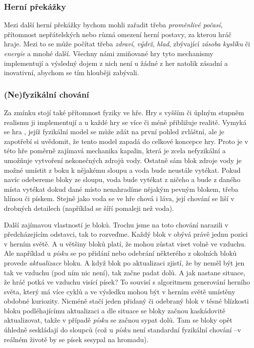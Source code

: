 \subsubsection{Herní překážky}

Mezi další herní překážky bychom mohli zařadit třeba \textit{proměnlivé počasí}, přítomnost nepřátelských \NPC{} nebo různá omezení herní postavy, za kterou hráč hraje. Mezi to se může počítat třeba \textit{zdraví}, \textit{výdrž}, \textit{hlad}, zbývající \textit{zásoba kyslíku} či \textit{energie} a mnohé další. Všechny námi zmiňované hry tyto mechanismy implementují a výsledný dojem z nich není u žádné z her natolik zásadní a inovativní, abychom se tím hlouběji zabývali.

\subsubsection{(Ne)fyzikální chování}

Za zmínku stojí také přítomnost fyziky ve hře. Hry s vyšším či úplným stupněm realismu ji implementují a u každé hry se více či méně přibližuje realitě. Vymyká se hra \MC{}, jejíž fyzikální model se může zdát na první pohled zvláštní, ale je zapotřebí si uvědomit, že tento model zapadá do celkové koncepce hry. Proto je v této hře poměrně zajímavá mechanika kapalin, která je zcela nefyzikální a umožňuje vytvoření nekonečných zdrojů vody. Ostatně sám blok zdroje vody je možné umístit z boku k nějakému sloupu a voda bude neustále vytékat. Pokud navíc odebereme bloky ze sloupu, voda bude vytékat z ničeho a bude z daného místa vytékat dokud dané místo nenahradíme nějakým pevným blokem, třeba hlínou či pískem. Stejně jako voda se ve hře chová i láva, její chování se liší v drobných detailech (například se šíří pomaleji než voda).

Další zajímavou vlastností je  bloků. Trochu jsme na toto chování narazili v předcházejícím odstavci, tak to rozveďme. Každý blok v  obývá právě jednu pozici v herním světě. A u většiny bloků platí, že mohou zůstat viset volně ve vzduchu. Ale například u \textit{písku} se po přidání nebo odebrání některého z okolních bloků provede \textit{aktualizace} bloku. A když blok po aktualizaci zjistí, že by neměl být jen tak ve vzduchu (pod ním nic není), tak začne padat dolů. A jak nastane situace, že hráč potká ve vzduchu visící písek? To souvisí s algoritmem generování herního světa, který má více cyklů a ve výsledku mohou být v herním světě umístěny obdobné kuriozity. Nicméně stačí jeden přidaný či odebraný blok v těsné blízkosti bloku podléhajícímu aktualizaci a dle situace se bloky začnou kaskádovitě aktualizovat, takže v případě \textit{písku} se začnou sypat dolů. Tam se bloky opět úhledně seskládají do sloupců (což u \textit{písku} není standardní fyzikální chování --v reálném životě by se písek sesypal na hromadu).


